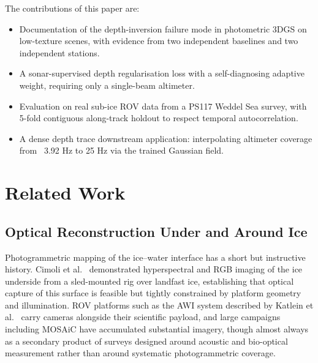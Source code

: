 \documentclass[conference]{IEEEtran}
\begin{document}
The contributions of this paper are:
\begin{itemize}
  \item Documentation of the depth-inversion failure mode in photometric 3DGS on
   low-texture scenes, with evidence from two independent baselines and two
   independent stations.
  \item A sonar-supervised depth regularisation loss with a self-diagnosing adaptive
   weight, requiring only a single-beam altimeter.
  \item Evaluation on real sub-ice ROV data from a PS117 Weddel Sea survey, with
   5-fold contiguous along-track holdout to respect temporal autocorrelation.
  \item A dense depth trace downstream application: interpolating altimeter coverage
   from ~3.92 Hz to 25 Hz via the trained Gaussian field.
\end{itemize}

\section{Related Work}

\subsection{Optical Reconstruction Under and Around Ice}

Photogrammetric mapping of the ice--water interface has a short but
instructive history. Cimoli et al.\ \cite{cimoli-2019} demonstrated
hyperspectral and RGB imaging of the ice underside from a sled-mounted rig
over landfast ice, establishing that optical capture of this surface is
feasible but tightly constrained by platform geometry and illumination. ROV
platforms such as the AWI system described by Katlein et al.\
\cite{katlein-2017} carry cameras alongside their scientific payload, and
large campaigns including MOSAiC \cite{anhaus-2025-rov} have accumulated
substantial imagery, though almost always as a secondary product of surveys
designed around acoustic and bio-optical measurement rather than around
systematic photogrammetric coverage.
\end{document}

